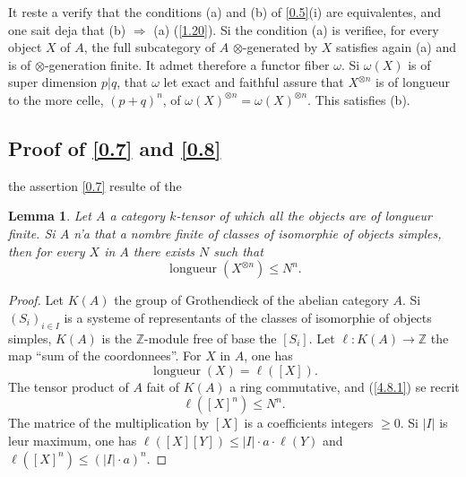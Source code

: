 \documentclass[11pt,a4paper]{article}
\theoremstyle{plain}
\newtheorem{lemma}[theorem]{Lemma}
\theoremstyle{definition}
\DeclareMathOperator{\longueur}{longueur}
\begin{document}
It reste a verify that the conditions (a) and (b) of \ref{0.5}(i) are equivalentes, and one sait deja that (b) $\Rightarrow$ (a) (\ref{1.20}). Si the condition (a) is verifiee, for every object $X$ of $A$, the full subcategory of $A$ $\otimes$-generated by $X$ satisfies again (a) and is of $\otimes$-generation finite. It admet therefore a functor fiber $\omega$. Si $\omega(X)$ is of super dimension $p|q$, that $\omega$ let exact and faithful assure that $X^{\otimes n}$ is of longueur to the more celle, $(p+q)^n$, of $\omega(X)^{\otimes n}=\omega(X)^{\otimes n}$. This satisfies (b).

\subsection{Proof of \ref{0.7} and \ref{0.8}}\label{4.7}

the assertion \ref{0.7} resulte of the

\begin{lemma}\label{4.8}
Let $A$ a category $k$-tensor of which all the objects are of longueur finite. Si $A$ n'a that a nombre finite of classes of isomorphie of objects simples, then for every $X$ in $A$ there exists $N$ such that
\begin{equation}\label{4.8.1}
\longueur(X^{\otimes n})\leq N^n.
\end{equation}
\end{lemma}

\begin{proof}
Let $K(A)$ the group of Grothendieck of the abelian category $A$. Si $(S_i)_{i\in I}$ is a systeme of representants of the classes of isomorphie of objects simples, $K(A)$ is the $\mathbb{Z}$-module free of base the $[S_i]$. Let $\ell:K(A)\to\mathbb{Z}$ the map ``sum of the coordonnees''. For $X$ in $A$, one has
\[
\longueur(X)=\ell([X]).
\]
The tensor product of $A$ fait of $K(A)$ a ring commutative, and (\ref{4.8.1}) se recrit
\[
\ell([X]^n)\leq N^n.
\]
The matrice of the multiplication by $[X]$ is a coefficients integers $\geq0$. Si $|I|$ is leur maximum, one has $\ell([X][Y])\leq|I|\cdot a\cdot\ell(Y)$ and $\ell([X]^n)\leq(|I|\cdot a)^n$.
\end{proof}
\end{document}
